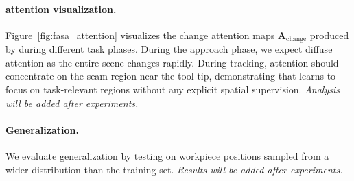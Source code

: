 \paragraph{\fasa{} attention visualization.} Figure~\ref{fig:fasa_attention} visualizes the change attention maps $\bm{A}_{\text{change}}$ produced by \fasa{} during different task phases. During the approach phase, we expect diffuse attention as the entire scene changes rapidly. During tracking, attention should concentrate on the seam region near the tool tip, demonstrating that \fasa{} learns to focus on task-relevant regions without any explicit spatial supervision. \textit{Analysis will be added after experiments.}

\paragraph{Generalization.} We evaluate generalization by testing on workpiece positions sampled from a wider distribution than the training set. \textit{Results will be added after experiments.}
